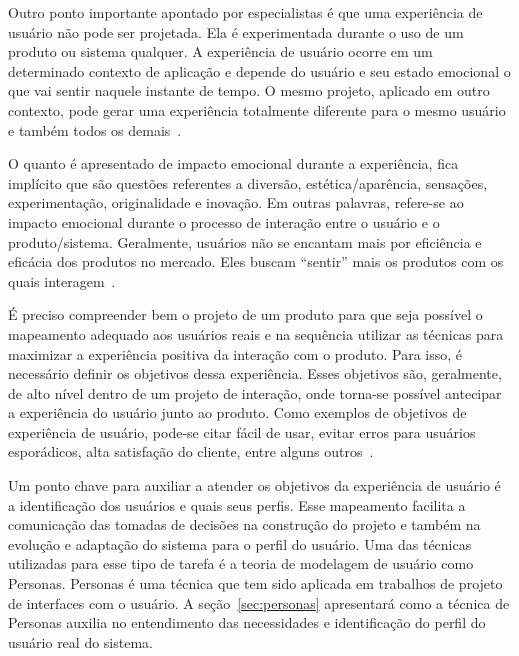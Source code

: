 Outro ponto importante apontado por especialistas é que uma experiência de usuário não pode ser projetada. Ela é experimentada durante o uso de um produto ou sistema qualquer. A experiência de usuário ocorre em um determinado contexto de aplicação e depende do usuário e seu estado emocional o que vai sentir naquele instante de tempo. O mesmo projeto, aplicado em outro contexto, pode gerar uma experiência totalmente diferente para o mesmo usuário e também todos os demais~\cite{anderson:2011, hartson:2012}.

O quanto é apresentado de impacto emocional durante a experiência, fica implícito que são questões referentes a diversão, estética/aparência, sensações, experimentação, originalidade e inovação. Em outras palavras, refere-se ao impacto emocional durante o processo de interação entre o usuário e o produto/sistema. Geralmente, usuários não se encantam mais por eficiência e eficácia dos produtos no mercado. Eles buscam ``sentir'' mais os produtos com os quais interagem~\cite{moggridge:2007, hartson:2012}.


É preciso compreender bem o projeto de um produto para que seja possível o mapeamento adequado aos usuários reais e na sequência utilizar as técnicas para maximizar a experiência positiva da interação com o produto. Para isso, é necessário definir os objetivos dessa experiência. Esses objetivos são, geralmente, de alto nível dentro de um projeto de interação, onde torna-se possível antecipar a experiência do usuário junto ao produto. Como exemplos de objetivos de experiência de usuário, pode-se citar fácil de usar, evitar erros para usuários esporádicos, alta satisfação do cliente, entre alguns outros~\cite{moggridge:2007, anderson:2011}.

Um ponto chave para auxiliar a atender os objetivos da experiência de usuário é a identificação dos usuários e quais seus perfis. Esse mapeamento facilita a comunicação das tomadas de decisões na construção do projeto e também na evolução e adaptação do sistema para o perfil do usuário. Uma das técnicas utilizadas para esse tipo de tarefa é a teoria de modelagem de usuário como Personas. Personas é uma técnica que tem sido aplicada em trabalhos de projeto de interfaces com o usuário. A seção~\ref{sec:personas} apresentará como a técnica de Personas auxilia no entendimento das necessidades e identificação do perfil do usuário real do sistema.

